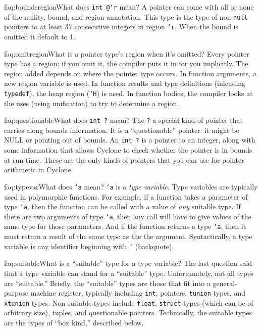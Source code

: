 \begin{faqa}{faq:boundsregion}{What does \texttt{int @\rb `r} mean?}
A pointer can come with all or none of the nullity, bound, and region
annotation.  This type is the type of non-\texttt{null} pointers to
at least 37 consecutive integers in region \texttt{`r}.  When the
bound is omitted it default to 1.
\end{faqa}

\begin{faqa}{faq:omitregion}{What is a pointer type's region when it's
omitted?} Every pointer type has a region; if you omit it, the
compiler puts it in for you implicitly.  The region added depends on
where the pointer type occurs.  In function arguments, a new region
variable is used.  In function results and type definitions (inlcuding
\texttt{typedef}), the heap region (\texttt{`H}) is used.  In function
bodies, the compiler looks at the uses (using unification) to try to
determine a region.
\end{faqa}

\begin{faqa}{faq:questionable}{What does \texttt{int ?} mean?}
The \texttt{?} a special kind of pointer that carries along bounds
information.  It is a ``questionable'' pointer: it might be NULL or
pointing out of bounds.  An \texttt{int ?} is a pointer to an integer,
along with some information that allows Cyclone to check whether the
pointer is in bounds at run-time.  These are the only kinds of
pointers that you can use for pointer arithmetic in Cyclone.
\end{faqa}

\begin{faqa}{faq:typevar}{What does \texttt{`a} mean?}
\texttt{`a} is a \emph{type variable}.  Type variables are typically
used in polymorphic functions.  For example, if a function takes a
parameter of type \texttt{`a}, then the function can be called with a
value of \emph{any} suitable type.  If there are two arguments of type
\texttt{`a}, then any call will have to give values of the same type
for those parameters.  And if the function returns a type \texttt{`a},
then it must return a result of the same type as the the argument.
Syntactically, a type variable is any identifier beginning with
\texttt{`} (backquote).
\end{faqa}

\begin{faqa}{faq:suitable}{What is a ``suitable'' type for a type variable?}
The last question said that a type variable can stand for a
``suitable'' type.  Unfortunately, not all types are ``suitable.''
Briefly, the ``suitable'' types are those that fit into a
general-purpose machine register, typically including \texttt{int},
pointers,
\texttt{tunion} types, and \texttt{xtunion} types.  Non-suitable types
include \texttt{float}, \texttt{struct} types (which can be of
arbitrary size), tuples, and questionable pointers.
Technically, the suitable types are the types of ``box kind,''
described below.
\end{faqa}

